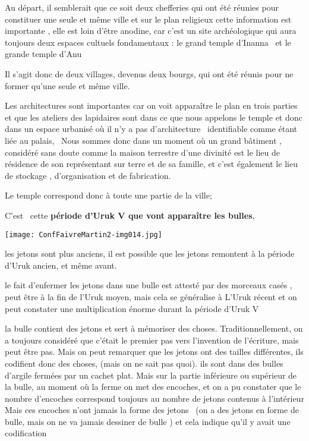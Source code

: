 \documentclass[a4paper]{article}
\begin{document}
{
Au départ, il semblerait que ce soit deux chefferies qui ont été réunies pour constituer une seule et même ville et sur
le plan religieux cette information est importante , elle est loin d'être anodine, car c'est un site archéologique qui
aura toujours deux espaces cultuels fondamentaux : le grand temple d'Inanna \ et le grande temple d'Anu}

{
Il s'agit donc de deux villages, devenus deux bourgs, qui ont été réunis pour ne former qu'une seule et même ville.}


\bigskip

{
Les architectures sont importantes car on voit apparaître le plan en trois parties et que les ateliers des lapidaires
sont dans ce que nous appelons le temple et donc dans un espace urbanisé où il n'y a pas d'architecture \ identifiable
comme étant liée au palais, \ Nous sommes donc dans un moment où un grand bâtiment , considéré sans doute comme la
maison terrestre d'une divinité est le lieu de résidence de son représentant sur terre et de sa famille, et c'est
également le lieu de stockage , d'organisation et de fabrication.}

{
Le temple correspond donc à toute une partie de la ville;}


\bigskip


\bigskip

{
C'est \ cette \textbf{période d'Uruk V que vont apparaître les bulles}, }


\bigskip


\bigskip

 \texttt{[image: ConfFaivreMartin2-img014.jpg]} 


\bigskip

{
les jetons sont plus anciens, il est possible que les jetons remontent à la période d'Uruk ancien, et même avant.}

{
le fait d'enfermer les jetons dans une bulle est attesté par des morceaux casés , peut être à la fin de l'Uruk moyen,
mais cela se généralise à L'Uruk récent et on peut constater une multiplication énorme durant la période d'Uruk V}


\bigskip

{
la bulle contient des jetons et sert à mémoriser des choses. Traditionnellement, on a toujours considéré que c'était le
premier pas vers l'invention de l'écriture, mais peut être pas. Mais on peut remarquer que les jetons ont des tailles
différentes, ils codifient donc des choses, (mais on ne sait pas quoi). ils sont dans des bulles d'argile fermées par
un cachet plat. Mais sur la partie inférieure ou supérieur de la bulle, au moment où la ferme on met des encoches, et
on a pu constater que le nombre d'encoches correspond toujours au nombre de jetons contenus à l'intérieur Mais ces
encoches n'ont jamais la forme des jetons \ (on a des jetons en forme de bulle, mais on ne va jamais dessiner de bulle
) et cela indique qu'il y avait une codification}
\end{document}
